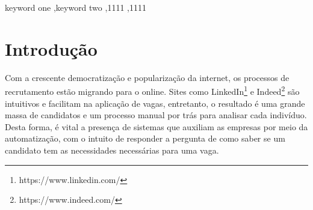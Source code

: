 \documentclass[preprint,12pt]{elsarticle}
\begin{document}
\begin{frontmatter}
\begin{abstract}
\end{abstract}



\begin{keyword}
keyword one \sep keyword two
 \sep 1111
 \sep 1111
\end{keyword}

\end{frontmatter}


\section{Introdução}
\label{sec:introducao}


Com a crescente democratização e popularização da internet, os processos de recrutamento estão migrando para o online. Sites como LinkedIn\footnote{https://www.linkedin.com/} e Indeed\footnote{https://www.indeed.com/} são intuitivos e facilitam na aplicação de vagas, entretanto, o resultado é uma grande massa de candidatos e um processo manual por trás para analisar cada indivíduo. Desta forma, é vital a presença de sistemas que auxiliam as empresas por meio da automatização, com o intuito de responder a pergunta de como saber se um candidato tem as necessidades necessárias para uma vaga.

\end{document}
